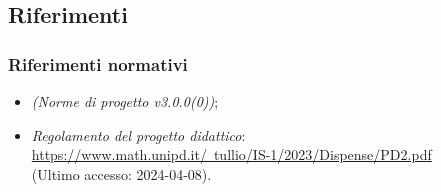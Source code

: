 \documentclass[10pt, a4paper]{article}
\begin{document}
\subsection{Riferimenti}

\subsubsection{Riferimenti normativi} 
\begin{itemize}
    \item \textit{(Norme di progetto v3.0.0(0))};
    \item \textit{Regolamento del progetto didattico}: \\
    \href{https://www.math.unipd.it/~tullio/IS-1/2023/Dispense/PD2.pdf}{https://www.math.unipd.it/~tullio/IS-1/2023/Dispense/PD2.pdf}\\
    (Ultimo accesso: 2024-04-08).
\end{itemize}

\end{document}
